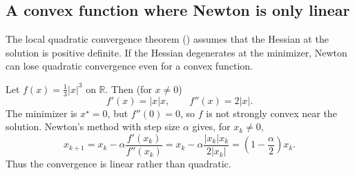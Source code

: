 \subsection{A convex function where Newton is only linear}
The local quadratic convergence theorem () assumes
that the Hessian at the solution is positive definite. If the Hessian
degenerates at the minimizer, Newton can lose quadratic convergence even for a
convex function.

\begin{example}[$f(x)=\frac13|x|^3$]
Let $f(x)=\frac{1}{3}|x|^3$ on $\mathbb{R}$. Then (for $x\neq 0$)
\[
  f'(x)=|x|x,\qquad f''(x)=2|x|.
\]
The minimizer is $x^\star=0$, but $f''(0)=0$, so $f$ is not strongly convex near
the solution. Newton's method with step size $\alpha$ gives, for $x_k\neq 0$,
\[
  x_{k+1}
  =x_k-\alpha \frac{f'(x_k)}{f''(x_k)}
  =x_k-\alpha \frac{|x_k|x_k}{2|x_k|}
  =\left(1-\frac{\alpha}{2}\right)x_k.
\]
Thus the convergence is linear rather than quadratic.
\end{example}
